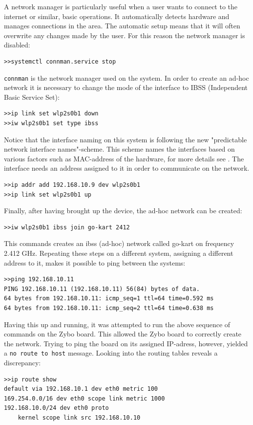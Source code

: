 A network manager is particularly useful when a user wants to connect to the internet or similar, basic operations.
It automatically detects hardware and manages connections in the area.
The automatic setup means that it will often overwrite any changes made by the user.
For this reason the network manager is disabled:
\begin{lstlisting}
>>systemctl connman.service stop
\end{lstlisting}
\texttt{connman} is the network manager used on the system.
In order to create an ad-hoc network it is necessary to change the mode of the interface to IBSS (Independent Basic Service Set):
\begin{lstlisting}
>>ip link set wlp2s0b1 down
>>iw wlp2s0b1 set type ibss
\end{lstlisting}
Notice that the interface naming on this system is following the new "predictable network interface names"-scheme.
This scheme names the interfaces based on various factors such as MAC-address of the hardware, for more details see \cite{interfacenaming}.
The interface needs an address assigned to it in order to communicate on the network.
\begin{lstlisting}
>>ip addr add 192.168.10.9 dev wlp2s0b1
>>ip link set wlp2s0b1 up
\end{lstlisting}
Finally, after having brought up the device, the ad-hoc network can be created:
\begin{lstlisting}
>>iw wlp2s0b1 ibss join go-kart 2412
\end{lstlisting}
This commands creates an ibss (ad-hoc) network called go-kart on frequency 2.412 \si{\giga\hertz}.
Repeating these steps on a different system, assigning a different address to it, makes it possible to ping between the systems: 
\begin{lstlisting}
>>ping 192.168.10.11
PING 192.168.10.11 (192.168.10.11) 56(84) bytes of data.
64 bytes from 192.168.10.11: icmp_seq=1 ttl=64 time=0.592 ms
64 bytes from 192.168.10.11: icmp_seq=2 ttl=64 time=0.638 ms
\end{lstlisting}
Having this up and running, it was attempted to run the above sequence of commands on the Zybo board.
This allowed the Zybo board to correctly create the network.
Trying to ping the board on its assigned IP-adress, however, yielded a \texttt{no route to host} message.
Looking into the routing tables reveals a discrepancy:
\begin{lstlisting}
>>ip route show
default via 192.168.10.1 dev eth0 metric 100 
169.254.0.0/16 dev eth0 scope link metric 1000 
192.168.10.0/24 dev eth0 proto 
	kernel scope link src 192.168.10.10 
\end{lstlisting}
